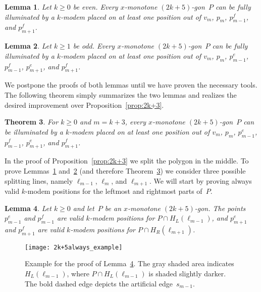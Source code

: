 \documentclass[A4]{article}
\newtheorem{theorem}{Theorem}
\newtheorem{lemma}[theorem]{Lemma}
\begin{document}
\begin{lemma}\label{lem:2k+5even}
Let $k\geq0$ be even.
Every $x$-monotone $(2k+5)$-gon~$P$ can be fully illuminated by a \mbox{$k$-modem} placed on at least one position out of $v_m$, $p_m$, $p^f_{m-1}$, and $p^f_{m+1}$.
\end{lemma}


\begin{lemma}\label{lem:2k+5odd}
Let $k\geq1$ be odd.
Every $x$-monotone $(2k+5)$-gon~$P$ can be fully illuminated by a \mbox{$k$-modem} placed on at least one position out of $v_m$, $p_m$, $p^e_{m-1}$, $p^f_{m-1}$, $p^e_{m+1}$, and $p^f_{m+1}$.
\end{lemma}

We postpone the proofs of both lemmas until we have proven the necessary tools.
The following theorem simply summarizes the two lemmas and realizes the desired improvement over Proposition~\ref{prop:2k+3}.

\begin{theorem}\label{thm:2k+5}
For $k\geq0$ and $m=k+3$, every $x$-monotone $(2k+5)$-gon~$P$ can be illuminated by a \mbox{$k$-modem} placed on at least one position out of $v_m$, $p_m$, $p^e_{m-1}$, $p^f_{m-1}$, $p^e_{m+1}$, and $p^f_{m+1}$.
\end{theorem}

In the proof of Proposition~\ref{prop:2k+3} we split the polygon in the middle.
To prove Lemmas~\ref{lem:2k+5even} and~\ref{lem:2k+5odd} (and therefore Theorem~\ref{thm:2k+5}) we consider three possible splitting lines, namely $\ell_{m-1}$, $\ell_m$, and $\ell_{m+1}$.
We will start by proving always valid \mbox{$k$-modem} positions for the leftmost and rightmost parts of~$P$.

\begin{lemma}\label{lem:2k+5always}
Let $k\geq0$ and let~$P$ be an $x$-monotone $(2k+5)$-gon.
The points $p^e_{m-1}$ and $p^f_{m-1}$ are valid \mbox{$k$-modem} positions for $P\cap H_L(\ell_{m-1})$, and $p^e_{m+1}$ and $p^f_{m+1}$ are valid \mbox{$k$-modem} positions for $P\cap H_R(\ell_{m+1})$.
\end{lemma}

\begin{figure}[htb]
  \centering
  \texttt{[image: 2k+5always\_example]}
  \caption{Example for the proof of Lemma~\ref{lem:2k+5always}. 
    The gray shaded area indicates $H_L(\ell_{m-1})$, where $P\cap H_L(\ell_{m-1})$ is shaded slightly darker.
    The bold dashed edge depicts the artificial edge~$s_{m-1}$.}
  \label{fig:2k+5always}
\end{figure}
\end{document}
